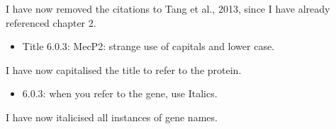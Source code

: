 \documentclass[10pt,a4paper,sans]{article}
\begin{document}
\noindent
I have now removed the citations to Tang et al., 2013, since I have already referenced chapter 2.

\begin{itemize}
   \item{Title 6.0.3: MecP2: strange use of capitals and lower case.}
\end{itemize}

\noindent
I have now capitalised the title to refer to the protein.

\begin{itemize}
   \item{6.0.3: when you refer to the gene, use Italics.}
\end{itemize}

\noindent
I have now italicised all instances of gene names.
\end{document}
